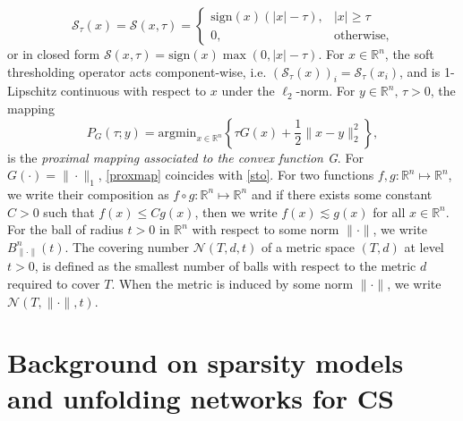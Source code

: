 \documentclass[preprint,12pt]{elsarticle}
\newcommand{\rn}{\mathbb{R}^n}
\newcommand{\st}{\mathcal{S}}\newcommand{\sgn}{\mathrm{sign}}
\begin{document}
    \begin{equation}\label{sto}
    \st_\tau(x)=\st(x,\tau)=
    \begin{cases}
    \sgn(x)(|x|-\tau),& |x|\geq\tau\\
    0,&\text{otherwise,}
    \end{cases}
    \end{equation} or in closed form $\st(x,\tau)=\sgn(x)\max(0,|x|-\tau)$. For $x\in\rn$, the soft thresholding operator acts component-wise, i.e. $(\st_\tau(x))_i=\st_\tau(x_i)$, and is 1-Lipschitz continuous with respect to $x$ under the $\ell_2$-norm. For $y\in\rn,\,\tau>0$, the mapping
    \begin{equation}\label{proxmap}
        P_G(\tau;y)=\mathrm{argmin}_{x\in\rn}\left\{\tau G(x)+\frac{1}{2}\|x-y\|_2^2\right\},
    \end{equation}
    is the \textit{proximal mapping associated to the convex function G}. For $G(\cdot)=\|\cdot\|_1$, \eqref{proxmap} coincides with \eqref{sto}. For two functions $f,g:\mathbb{R}^n\mapsto\mathbb{R}^n$, we write their composition as $f\circ g:\mathbb{R}^n\mapsto\mathbb{R}^n$ and if there exists some constant $C>0$ such that $f(x)\leq Cg(x)$, then we write $f(x)\lesssim g(x)$ for all $x\in\rn$. For the ball of radius $t>0$ in $\rn$ with respect to some norm $\|\cdot\|$, we write $B_{\|\cdot\|}^n(t)$. The covering number $\mathcal{N}(T,d,t)$ of a metric space $(T,d)$ at level $t>0$, is defined as the smallest number of balls with respect to the metric $d$ required to cover $T$. When the metric is induced by some norm $\|\cdot\|$, we write $\mathcal{N}(T,\|\cdot\|,t)$.

\section{Background on sparsity models and unfolding networks for CS}\label{relwork}
\end{document}
